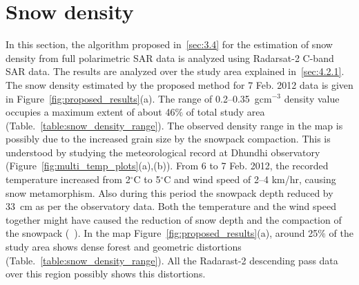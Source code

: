 \section{Snow density}
\label{S:4}

In this section, the algorithm proposed in~\cref{sec:3.4} for the estimation of snow density from full polarimetric SAR data is analyzed using Radarsat-2 C-band SAR data. The results are analyzed over the study area explained in~\cref{sec:4.2.1}. The snow density estimated by the proposed method for 7 Feb. 2012 data is given in Figure~\ref{fig:proposed_results}(a). The range of 0.2--0.35~gcm$^{-3}$ density value occupies a maximum extent of about 46$\%$ of total study area (Table.~\ref{table:snow_density_range}). The observed density range in the map is possibly due to the increased grain size by the snowpack compaction. This is understood by studying the meteorological record at Dhundhi observatory (Figure~\ref{fig:multi_temp_plots}(a),(b)). From 6 to 7 Feb. 2012, the recorded temperature increased from 2$^\circ$C to 5$^\circ$C and wind speed of 2--4 km/hr, causing snow metamorphism. Also during this period the snowpack depth reduced by 33~cm as per the observatory data. Both the temperature and the wind speed together might have caused the reduction of snow depth and the compaction of the snowpack (~\citep{MET40}). In the map Figure~\ref{fig:proposed_results}(a), around 25$\%$ of the study area shows dense forest and geometric distortions (Table.~\ref{table:snow_density_range}). All the Radarast-2 descending pass data over this region possibly shows this distortions.

